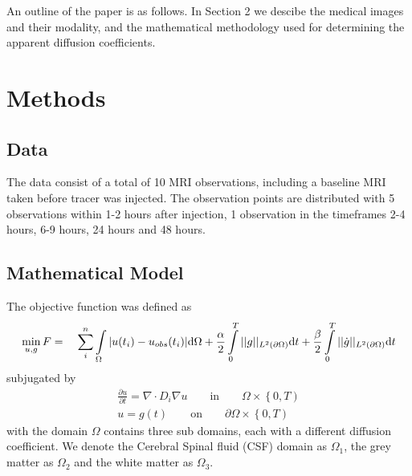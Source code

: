 \documentclass[11pt,a4paper]{article}
\begin{document}
An outline of the paper is as follows. In Section 2 we descibe the medical images and their modality,  
and the mathematical methodology used for determining the apparent diffusion coefficients.  


\section{Methods}


\subsection*{Data}
The data consist of a total of 10 MRI observations, including a baseline MRI taken before tracer was injected. The observation points are distributed with 5 observations within 1-2 hours after injection, 1 observation in the timeframes 2-4 hours, 6-9 hours, 24 hours and 48 hours. 




\subsection*{Mathematical Model}
The objective function was defined as 
\begin{equation}
\min_{u,g} F = \quad \sum\limits_i\sp{n} \int\limits_{\Omega} |u(t_i) - u_{obs}(t_i)| \mathrm{d}\Omega + \frac{\alpha}{2} \int\limits_{0}\sp{T} || g ||_{L\sp{2}(\partial\Omega)} \mathrm{d}t + \frac{\beta}{2} \int\limits_{0}\sp{T} || \dot{g} ||_{L\sp{2}(\partial\Omega)}\mathrm{d}t 
\label{EQ::objf}
\end{equation}
subjugated by   
\begin{equation}
\begin{aligned}
\frac{\partial u}{\partial t} = \nabla \cdot  D_i \nabla u \qquad \text{in} \qquad \Omega \times \left\lbrace 0 , T \right)  \\
u=g(t) \qquad \text{on} \qquad \partial\Omega  \times \left\lbrace 0 , T \right) 
\end{aligned}
\label{Eq::PDE}
\end{equation}
with the domain $\Omega$ contains three sub domains, each with a different diffusion coefficient. We denote the Cerebral Spinal fluid (CSF) domain as $\Omega_1$, the grey matter as $\Omega_2$ and the white matter as $\Omega_3$.
\end{document}
